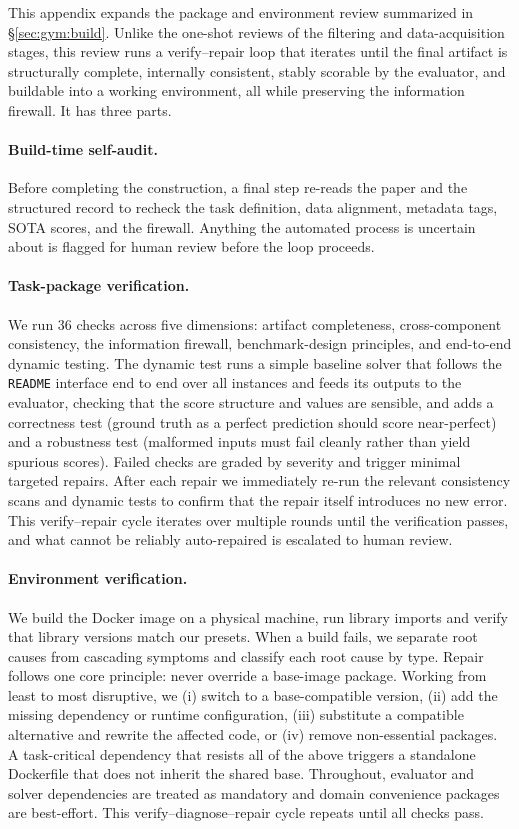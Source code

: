 \documentclass{llmxive}
\begin{document}
This appendix expands the package and environment review summarized in \S\ref{sec:gym:build}. Unlike the one-shot reviews of the filtering and data-acquisition stages, this review runs a verify--repair loop that iterates until the final artifact is structurally complete, internally consistent, stably scorable by the evaluator, and buildable into a working environment, all while preserving the information firewall. It has three parts.

\paragraph{Build-time self-audit.}
Before completing the construction, a final step re-reads the paper and the structured record to recheck the task definition, data alignment, metadata tags, SOTA scores, and the firewall. Anything the automated process is uncertain about is flagged for human review before the loop proceeds.

\paragraph{Task-package verification.}
We run 36 checks across five dimensions: artifact completeness, cross-component consistency, the information firewall, benchmark-design principles, and end-to-end dynamic testing. The dynamic test runs a simple baseline solver that follows the \texttt{README} interface end to end over all instances and feeds its outputs to the evaluator, checking that the score structure and values are sensible, and adds a correctness test (ground truth as a perfect prediction should score near-perfect) and a robustness test (malformed inputs must fail cleanly rather than yield spurious scores). Failed checks are graded by severity and trigger minimal targeted repairs. After each repair we immediately re-run the relevant consistency scans and dynamic tests to confirm that the repair itself introduces no new error. This verify--repair cycle iterates over multiple rounds until the verification passes, and what cannot be reliably auto-repaired is escalated to human review.

\paragraph{Environment verification.}
We build the Docker image on a physical machine, run library imports and verify that library versions match our presets. When a build fails, we separate root causes from cascading symptoms and classify each root cause by type. Repair follows one core principle: never override a base-image package. Working from least to most disruptive, we (i) switch to a base-compatible version, (ii) add the missing dependency or runtime configuration, (iii) substitute a compatible alternative and rewrite the affected code, or (iv) remove non-essential packages. A task-critical dependency that resists all of the above triggers a standalone Dockerfile that does not inherit the shared base. Throughout, evaluator and solver dependencies are treated as mandatory and domain convenience packages are best-effort. This verify--diagnose--repair cycle repeats until all checks pass.
\end{document}
